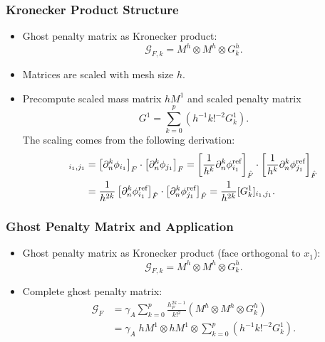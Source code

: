 \documentclass{beamer}
\begin{document}
\begin{frame}
    \frametitle{Kronecker Product Structure}
    \begin{itemize}
        \item Ghost penalty matrix as Kronecker product:
              \[
                  \mathcal{G}_{F,k} = M^{h} \otimes M^{h} \otimes G^h_k .
              \]
        \item Matrices are scaled with mesh size $h$.
        \item Precompute scaled mass matrix  $h M^1$ and scaled penalty matrix
              \[
                  G^1 = \sum_{k=0}^p \left( { h^{-1} k!^{-2}} G^1_k \right).
              \]
              The scaling comes from the following derivation:
              \begin{align*}
                  [G^h_k]_{i_1,j_1} & = \left[\partial_n^k \phi_{i_1}\right]_{F}\cdot \left[\partial_n^k
                      \phi_{j_1}\right]_{F}
                  =  \left[{1\over h^k} \partial_n^k \phi^{\text{ref}}_{i_1}\right] _{\hat{F}} \cdot \left[{1\over h^k}
                      \partial_n^k \phi^\text{ref}_{j_1}\right]_{\hat{F}}
                  \nonumber
                  \\
                                    & = {1\over h^{2k}} \left[\partial_n^k
                      \phi^{\text{ref}}_{i_1}\right]_{\hat{F}}\cdot
                  \left[\partial_n^k \phi^{\text{ref}}_{j_1}\right]_{\hat{F}}= {1\over h^{2k}} [G^1_k]_{i_1,j_1}.
              \end{align*}
    \end{itemize}
\end{frame}

\begin{frame}
    \frametitle{Ghost Penalty Matrix and Application}
    \begin{itemize}
        \item Ghost penalty matrix as Kronecker product (face orthogonal to $x_1$):
              \[
                  \mathcal{G}_{F,k} = M^{h} \otimes M^{h} \otimes G^h_k .
              \]
        \item Complete ghost penalty matrix:
              \begin{align*}
                  \mathcal{G}_F & = \gamma_A \sum_{k=0}^p \frac{h_F^{2k-1}}{k!^2} \left( M^h \otimes M^h \otimes
                  G^h_k
                  \right)                                                                                        \\
                                & = \gamma_A \; h M^1 \otimes h M^1 \otimes	\sum_{k=0}^p \left( { h^{-1} k!^{-2}}
                  G^1_k
                  \right).
              \end{align*}
    \end{itemize}
\end{frame}
\end{document}
